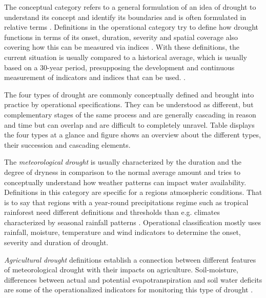 The conceptual category refers to a general formulation of an idea of drought to understand its concept and identify its boundaries and is often formulated in relative terms \autocite{wilhiteUnderstandingDroughtPhenomenon1985}. Definitions in the operational category try to define how drought functions in terms of its onset, duration, severity and spatial coverage also covering how this can be measured via indices \autocite{balintMonitoringDroughtCombined2013, nationaldroughtmitigationcenterWhatDrought, wilhiteUnderstandingDroughtPhenomenon1985}. With these definitions, the current situation is usually compared to a historical average, which is usually based on a 30-year period,  presupposing the development and continuous measurement of indicators and indices that can be used. \autocite{vereintenationenSpecialReportDrought2021,wilhiteUnderstandingDroughtPhenomenon1985}.

The four types of drought are commonly conceptually defined and brought into practice by operational specifications. They can be understood as different, but complementary stages of the same process and are generally cascading in reason and time but can overlap and are difficult to completely unravel. Table  displays the four types at a glance and figure  shows an overview about the different types, their succession and cascading elements.


The \textit{meteorological drought} is usually characterized by the duration and the degree of dryness in comparison to the normal average amount and tries to conceptually understand how weather patterns can impact water availability. Definitions in this category are specific for a regions atmospheric conditions. That is to say that regions with a year-round precipitations regime such as tropical rainforest need different definitions and thresholds than e.g. climates characterized by seasonal rainfall patterns \autocite{nationaldroughtmitigationcenterTypesDrought}. Operational classification mostly uses rainfall, moisture, temperature and wind indicators to determine the onset, severity and duration of drought.

\textit{Agricultural drought} definitions establish a connection between different features of meteorological drought with their impacts on agriculture. Soil-moisture, differences between actual and potential evapotranspiration and soil water deficits are some of the operationalized indicators for monitoring this type of drought \autocite{baltiReviewDroughtMonitoring2020,nationaldroughtmitigationcenterTypesDrought,wilhiteUnderstandingDroughtPhenomenon1985}.

